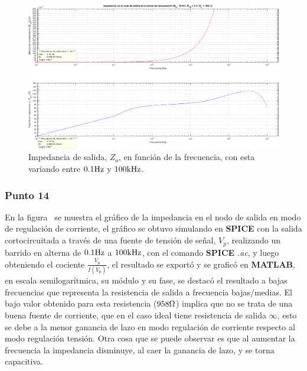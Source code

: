 \clearpage

\begin{figure}[H] %
\begin{center}
\includegraphics[width=1.2 \textwidth, angle=90]{./img/preguntas/p21_13.png}
\caption{\label{fig:fig_p21_p13_output_impedance}\footnotesize{Impedancia de salida, $Z_{o}$, en función de la frecuencia, con esta variando entre $0.1 \si[per-mode=symbol]{\hertz}$ y $100 \si[per-mode=symbol]{\kilo\hertz}$.}}
\end{center}
\end{figure}



\clearpage



\subsubsection{Punto 14}



En la figura~ se muestra el gráfico de la impedancia en el nodo de salida en modo de regulación de corriente, el gráfico se obtuvo simulando en \textbf{SPICE} con la salida cortocircuitada a través de una fuente de tensión de señal, $V_{p}$, realizando un barrido en alterna de $0.1 \si[per-mode=symbol]{\hertz}$ a $100 \si[per-mode=symbol]{\kilo\hertz}$, con el comando \textbf{SPICE} \textit{.ac}, y luego obteniendo el cociente $\frac{V_{p}}{I\left({V_{p}}\right)}$, el resultado se exportó y se graficó en \textbf{MATLAB}, en escala semilogarítmica, su módulo y su fase, se destacó el resultado a bajas frecuencias que representa la resistencia de salida a frecuencia bajas/medias. El bajo valor obtenido para esta resistencia ($958 \si[per-mode=symbol]{\ohm}$) implica que no se trata de una buena fuente de corriente, que en el caso ideal tiene resistencia de salida $\infty$, esto se debe a la menor ganancia de lazo en modo regulación de corriente respecto al modo regulación tensión. Otra cosa que se puede observar es que al aumentar la frecuencia la impedancia disminuye, al caer la ganancia de lazo, y se torna capacitiva.



